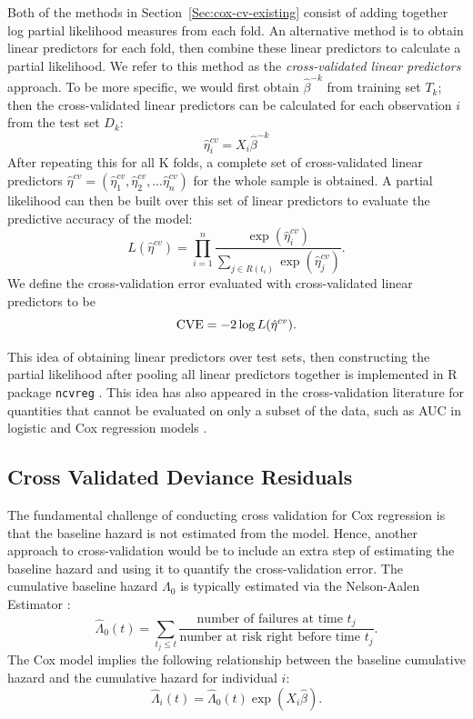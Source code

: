 \par Both of the methods in Section~\ref{Sec:cox-cv-existing} consist of adding together log partial likelihood measures from each fold.  An alternative method is to obtain linear predictors for each fold, then combine these linear predictors to calculate a partial likelihood. We refer to this method as the \emph{cross-validated linear predictors} approach. To be more specific, we would first obtain $\hat{\beta}^{-k}$ from training set $T_{k}$; then the cross-validated linear predictors can be calculated for each observation $i$ from the test set $D_k$:  
\begin{equation}
  \label{eq:cv-lp}
  \hat{\eta}^{cv}_{i} = X_{i}\hat{\beta}^{-k}
\end{equation} 
After repeating this for all K folds, a complete set of cross-validated linear predictors $\hat{\eta}^{cv} = ( \hat{\eta}^{cv}_{1},  \hat{\eta}^{cv}_{2} , ...  \hat{\eta}^{cv}_{n})$ for the whole sample is obtained. A partial likelihood can then be built over this set of linear predictors to evaluate the predictive accuracy of the model: 
	\begin{equation} 
	L(\hat{\eta}^{cv}) = \prod_{i=1}^{n} \frac{\exp (\hat{\eta}^{cv}_{i})}{\sum_{ j \in R(t_{i})}\exp (\hat{\eta}^{cv}_{j})}.
	\end{equation}
We define the cross-validation error evaluated with cross-validated linear predictors to be $$\textrm{CVE} = - 2 \log L(\hat{\eta}^{cv}).$$
  
\par This idea of obtaining linear predictors over test sets, then constructing the partial likelihood after pooling all linear predictors together is implemented in R package \texttt{ncvreg} \citep{ncvreg}. This idea has also appeared in the cross-validation literature for quantities that cannot be evaluated on only a subset of the data, such as AUC in logistic and Cox regression models \citep{Parker2007,Simon2011a,Subramanian2011}.

\subsection{Cross Validated Deviance Residuals}

The fundamental challenge of conducting cross validation for Cox regression is that the baseline hazard is not estimated from the model. Hence, another approach to cross-validation would be to include an extra step of estimating the baseline hazard and using it to quantify the cross-validation error. The cumulative baseline hazard $\Lambda_0$ is typically estimated via the Nelson-Aalen Estimator \citep{nelson1969, aalen1978}:
\begin{equation}
  \hat{\Lambda}_{0}(t) = \sum_{t_j \leq t}\frac{\text{number of failures at time } t_j}{\text{number at risk right before time }t_j}.
\end{equation}
The Cox model implies the following relationship between the baseline cumulative hazard and the cumulative hazard for individual $i$:
\begin{equation}
  \hat{\Lambda}_{i}(t) =  \hat{\Lambda}_{0}(t)\exp(X_i\hat\beta).
\end{equation}

